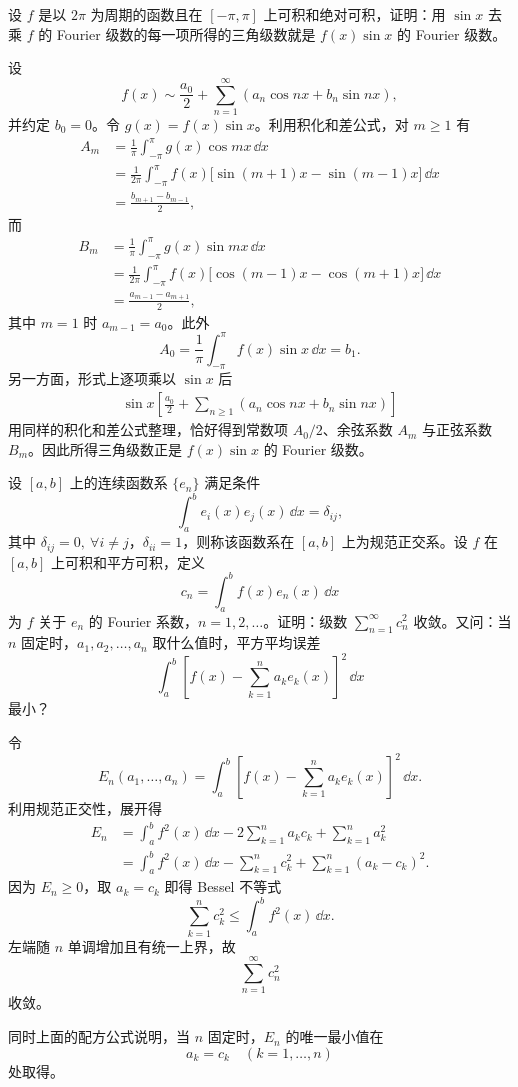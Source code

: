 \begin{xexercise}[6]
设 $f$ 是以 $2\pi$ 为周期的函数且在 $[-\pi,\pi]$ 上可积和绝对可积，证明：用 $\sin x$ 去乘 $f$ 的 Fourier 级数的每一项所得的三角级数就是 $f(x)\sin x$ 的 Fourier 级数。
\end{xexercise}
\begin{xsolution}
设
\[
  f(x)\sim\frac{a_0}{2}+\sum_{n=1}^{\infty}(a_n\cos nx+b_n\sin nx),
\]
并约定 $b_0=0$。令 $g(x)=f(x)\sin x$。利用积化和差公式，对 $m\ge1$ 有
\begin{align*}
  A_m
  &=\frac1\pi\int_{-\pi}^{\pi}g(x)\cos mx\,\dd x\\
  &=\frac1{2\pi}\int_{-\pi}^{\pi}f(x)
    \bigl[\sin(m+1)x-\sin(m-1)x\bigr]\,\dd x\\
  &=\frac{b_{m+1}-b_{m-1}}2,
\end{align*}
而
\begin{align*}
  B_m
  &=\frac1\pi\int_{-\pi}^{\pi}g(x)\sin mx\,\dd x\\
  &=\frac1{2\pi}\int_{-\pi}^{\pi}f(x)
    \bigl[\cos(m-1)x-\cos(m+1)x\bigr]\,\dd x\\
  &=\frac{a_{m-1}-a_{m+1}}2,
\end{align*}
其中 $m=1$ 时 $a_{m-1}=a_0$。此外
\[
  A_0=\frac1\pi\int_{-\pi}^{\pi}f(x)\sin x\,\dd x=b_1.
\]
另一方面，形式上逐项乘以 $\sin x$ 后
\begin{align*}
  \sin x\left[\frac{a_0}{2}+\sum_{n\ge1}(a_n\cos nx+b_n\sin nx)\right]
\end{align*}
用同样的积化和差公式整理，恰好得到常数项 $A_0/2$、余弦系数 $A_m$ 与正弦系数 $B_m$。因此所得三角级数正是 $f(x)\sin x$ 的 Fourier 级数。
\end{xsolution}


\begin{xexercise}[7]
设 $[a,b]$ 上的连续函数系 $\{e_n\}$ 满足条件
  \[
    \int_a^b e_i(x)e_j(x)\,\dd x=\delta_{ij},
  \]
  其中 $\delta_{ij}=0,\ \forall i\ne j$，$\delta_{ii}=1$，则称该函数系在 $[a,b]$ 上为规范正交系。设 $f$ 在 $[a,b]$ 上可积和平方可积，定义
  \[
    c_n=\int_a^b f(x)e_n(x)\,\dd x
  \]
  为 $f$ 关于 $e_n$ 的 Fourier 系数，$n=1,2,\ldots$。证明：级数 $\sum_{n=1}^{\infty}c_n^2$ 收敛。又问：当 $n$ 固定时，$a_1,a_2,\ldots,a_n$ 取什么值时，平方平均误差
  \[
    \int_a^b\left[f(x)-\sum_{k=1}^{n}a_ke_k(x)\right]^2\,\dd x
  \]
  最小？
\end{xexercise}
\begin{xsolution}
令
\[
  E_n(a_1,\ldots,a_n)
  =\int_a^b\left[f(x)-\sum_{k=1}^{n}a_ke_k(x)\right]^2\,\dd x.
\]
利用规范正交性，展开得
\begin{align*}
  E_n
  &=\int_a^bf^2(x)\,\dd x
    -2\sum_{k=1}^{n}a_kc_k+\sum_{k=1}^{n}a_k^2\\
  &=\int_a^bf^2(x)\,\dd x-\sum_{k=1}^{n}c_k^2
    +\sum_{k=1}^{n}(a_k-c_k)^2.
\end{align*}
因为 $E_n\ge0$，取 $a_k=c_k$ 即得 Bessel 不等式
\[
  \sum_{k=1}^{n}c_k^2\le\int_a^bf^2(x)\,\dd x.
\]
左端随 $n$ 单调增加且有统一上界，故
\[
  \sum_{n=1}^{\infty}c_n^2
\]
收敛。

同时上面的配方公式说明，当 $n$ 固定时，$E_n$ 的唯一最小值在
\[
  \boxed{a_k=c_k\quad(k=1,\ldots,n)}
\]
处取得。
\end{xsolution}


